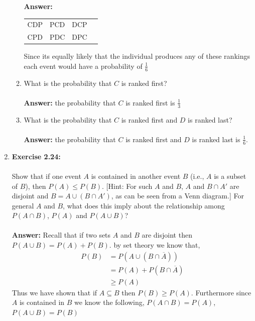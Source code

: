 \documentclass[12pt]{article}
\theoremstyle{homework}
\begin{document}
\begin{enumerate}
\begin{enumerate}
\textbf{Answer:}
\begin{center}
 \begin{tabular}{c c c c}
 CDP & PCD & DCP \\
 CPD & PDC & DPC
 \end{tabular}
\end{center}
 Since its equally likely that the individual produces any of these rankings each event would have a probability of $\frac{1}{6}$\\

\item What is the probability that $C$ is ranked first?\\
\\
 \textbf{Answer:} the probability that $C$ is ranked first is $\frac{1}{3}$
 \\
\item What is the probability that $C$ is ranked first and $D$ is ranked last?\\
\\
 \textbf{Answer:} the probability that $C$ is ranked first and $D$ is ranked last is $\frac{1}{6}$.
 \\
\end{enumerate}
\vspace{1in}


\item\hspace{.5in}\textbf{Exercise 2.24:}\\
\\
Show that if one event $A$ is contained in another event $B$ (i.e., $A$ is a subset of $B$), then $P(A) \leq P(B).$ [Hint: For such $A$ and $B$, $A$ and $B\cap A'$ are disjoint and $B= A \cup (B \cap A')$, as can be seen from a Venn diagram.] For general $A$ and $B$, what does this imply about the relationship among $P(A\cap B)$, $P(A)$ and $P(A \cup B)$?\\
\\
 \textbf{Answer:} Recall that if two sets $A$ and $B$ are disjoint then $P(A\cup B) = P(A) +P(B)$. by set theory we know that,
 \begin{align*}
   P(B) &= P(A \cup (B\cap\overline{A}))\\
   &= P(A) + P(B\cap\overline{A})\\
   &\geq P(A)
 \end{align*}
Thus we have shown that if $A \subseteq B$ then $P(B) \geq P(A)$. Furthermore since $A$ is contained in $B$ we know the following, $P(A \cap B) = P(A)$, $P(A \cup B) = P(B)$





\end{enumerate}
\end{document}
